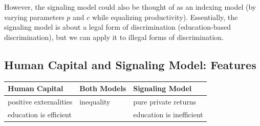 \documentclass[10pt]{extarticle}
\begin{document}
  However, the signaling model could also be thought of as an indexing model (by varying parameters $p$ and $c$ while equalizing productivity). Essentially, the signaling model is about a legal form of discrimination (education-based discrimination), but we can apply it to illegal forms of discrimination.
  \subsection{Human Capital and Signaling Model: Features}%
  \begin{center}
    \renewcommand{\arraystretch}{1.5}
    \begin{tabular}{m{}|m{}|m{}}
      Human Capital & Both Models & Signaling Model\\
      \hline
      positive externalities & inequality & pure private returns\\
      education is efficient & & education is inefficient
    \end{tabular}
  \end{center}
\end{document}
